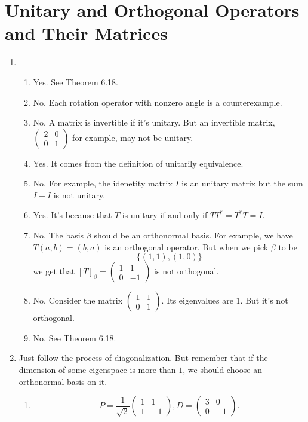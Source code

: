 \section{Unitary and Orthogonal Operators and Their Matrices}
\begin{enumerate}
\item \begin{enumerate}
\item Yes. See Theorem 6.18.
\item No. Each rotation operator with nonzero angle is a counterexample.
\item No. A matrix is invertible if it's unitary. But an invertible matrix, $\begin{pmatrix}2&0\\0&1\end{pmatrix}$ for example, may not be unitary.
\item Yes. It comes from the definition of unitarily equivalence.
\item No. For example, the idenetity matrix $I$ is an unitary matrix but the sum $I+I$ is not unitary.
\item Yes. It's because that $T$ is unitary if and only if $TT^*=T^*T=I$.
\item No. The basis $\beta$ should be an orthonormal basis. For example, we have $T(a,b)=(b,a)$ is an orthogonal operator. But when we pick $\beta $ to be 
\[\{(1,1),(1,0)\}\]
we get that $[T]_{\beta}=\begin{pmatrix}1&1\\0&-1\end{pmatrix}$ is not orthogonal.
\item No. Consider the matrix $\begin{pmatrix}1&1\\0&1\end{pmatrix}$. Its eigenvalues are $1$. But it's not orthogonal.
\item No. See Theorem 6.18.
\end{enumerate}
\item Just follow the process of diagonalization. But remember that if the dimension of some eigenspace is more than $1$, we should choose an orthonormal basis on it.
\begin{enumerate}
\item \[P=\frac{1}{\sqrt{2}}\begin{pmatrix}1&1\\1&-1\end{pmatrix}, D=\begin{pmatrix}3&0\\0&-1\end{pmatrix}.\]

\end{enumerate}
\end{enumerate}
